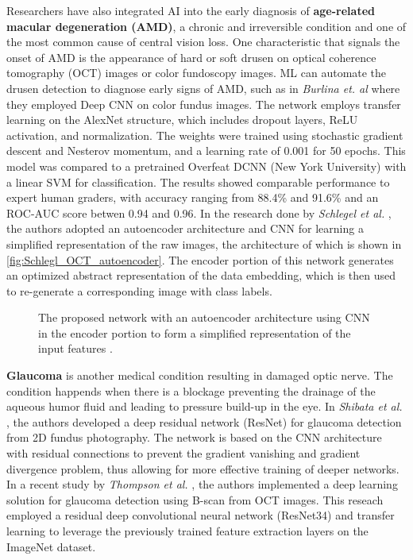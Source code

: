 \documentclass[a4paper]{article}
\begin{document}
Researchers have also integrated AI into the early diagnosis of \textbf{age-related macular degeneration (AMD)}, a chronic and irreversible condition and one of the most common cause of central vision loss. 
One characteristic that signals the onset of AMD is the appearance of hard or soft drusen on optical coherence tomography (OCT) images or color fundoscopy images.
ML can automate the drusen detection to diagnose early signs of AMD, such as in \textit{Burlina et. al} \cite{burlina_automated_2017} where they employed Deep CNN on color fundus images. The network employs transfer learning on the AlexNet structure, which includes dropout layers, ReLU activation, and normalization. The weights were trained using stochastic gradient descent and Nesterov momentum, and a learning rate of 0.001 for 50 epochs. This model was compared to a pretrained Overfeat DCNN (New York University) with a linear SVM for classification. The results showed comparable performance to expert human graders, with accuracy ranging from 88.4\% and 91.6\% and an ROC-AUC score betwen 0.94 and 0.96.
In the research done by \textit{Schlegel et al.} \cite{schlegl_fully_2018}, the authors adopted an autoencoder architecture and CNN for learning a simplified representation of the raw images, the architecture of which is shown in \autoref{fig:Schlegl_OCT_autoencoder}. The encoder portion of this network generates an optimized abstract representation of the data embedding, which is then used to re-generate a corresponding image with class labels.
\begin{figure}[htbp]
    \caption{The proposed network with an autoencoder architecture using CNN in the encoder portion to form a simplified representation of the input features \cite{schlegl_fully_2018}.} 
    \label{fig:Schlegl_OCT_autoencoder}
\end{figure}

\textbf{Glaucoma} is another medical condition resulting in damaged optic nerve. The condition happends when there is a blockage preventing the drainage of the aqueous humor fluid and leading to pressure build-up in the eye.
In \textit{Shibata et al.} \cite{shibata_development_2018}, the authors developed a deep residual network (ResNet) for glaucoma detection from 2D fundus photography. The network is based on the CNN architecture with residual connections to prevent the gradient vanishing and gradient divergence problem, thus allowing for more effective training of deeper networks.
In a recent study by \textit{Thompson et al.} \cite{thompson_assessment_2020}, the authors implemented a deep learning solution for glaucoma detection using B-scan from OCT images. This reseach employed a residual deep convolutional neural network (ResNet34) and transfer learning to leverage the previously trained feature extraction layers on the ImageNet dataset.
\end{document}
